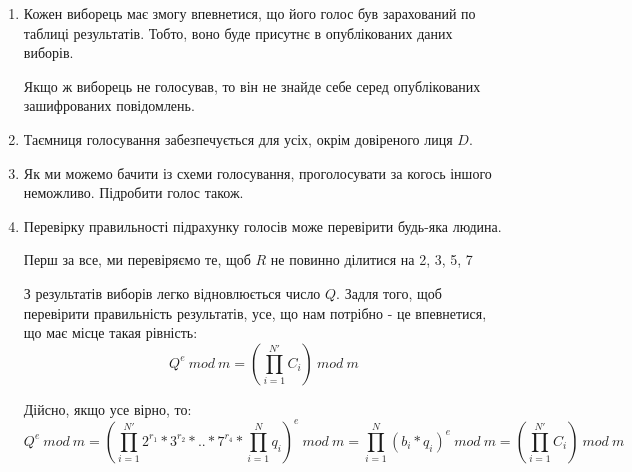\documentclass[12pt]{report}
\theoremstyle{plain}
\theoremstyle{definition}
\theoremstyle{remark}
\begin{document}
\begin{enumerate}
    \item Кожен виборець має змогу впевнетися, що його голос був зарахований по таблиці результатів.
    Тобто, воно буде присутнє в опублікованих даних виборів.

    Якщо ж виборець не голосував, то він не знайде себе серед опублікованих зашифрованих повідомлень.
    
    \item Таємниця голосування забезпечується для усіх, окрім довіреного лиця $D$.

    \item Як ми можемо бачити із схеми голосування, проголосувати за когось іншого неможливо. Підробити
    голос також.

    \item Перевірку правильності підрахунку голосів може перевірити будь-яка людина.

    Перш за все, ми перевіряємо те, щоб $R$ не повинно ділитися на 2, 3, 5, 7 

    З результатів виборів легко відновлюється число $Q$. Задля того, щоб перевірити правильність
    результатів, усе, що нам потрібно - це впевнетися, що має місце такая рівність:
    \[ Q^e \ mod \ m = (\prod_{i=1}^{N'} C_i) \ mod \ m\]

    Дійсно, якщо усе вірно, то:
    \[ Q^e \ mod \ m = (\prod_{i=1}^{N'} 2^{r_1} * 3^{r_2} * .. * 7 ^{r_4} * \prod_{i=1}^N q_i)^e 
    \ mod \ m  = \prod_{i=1}^N (b_i*q_i)^e\ mod\ m = (\prod_{i=1}^{N'} C_i) \ mod \ m\]

\end{enumerate}
\end{document}
